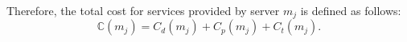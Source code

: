 \documentclass[10pt, conference, letterpaper]{IEEEtran}
\begin{document}
Therefore, the total cost for services provided by server $m_j$ is defined as follows: 
\begin{equation}
\mathbb{C}(m_j) = C_{d}(m_j) + C_{p}(m_j) + C_{t}(m_j).
	 \label{eq1}
\end{equation}

\end{document}
